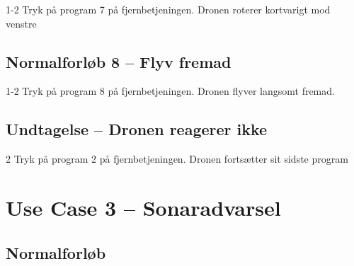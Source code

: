 \documentclass[Main]{subfiles}
\begin{document}
\begin{TestCase}
\TC
{1-2}
{Tryk på program 7 på fjernbetjeningen.}
{Dronen roterer kortvarigt mod venstre}
{}
\end{TestCase}




\subsection*{Normalforløb 8 -- Flyv fremad}

\begin{TestCaseIntro}
\end{TestCaseIntro}

\begin{TestCase}
\TC
{1-2}
{Tryk på program 8 på fjernbetjeningen.}
{Dronen flyver langsomt fremad.}
{}
\end{TestCase}





\subsection*{Undtagelse -- Dronen reagerer ikke}

\begin{TestCaseIntro}
\end{TestCaseIntro}

\begin{TestCase}
\TC
{2}
{Tryk på program 2 på fjernbetjeningen.}
{Dronen fortsætter sit sidste program}
{}
\end{TestCase}









\newpage
\section{Use Case 3 -- Sonaradvarsel}

\subsection*{Normalforløb}
\end{document}
